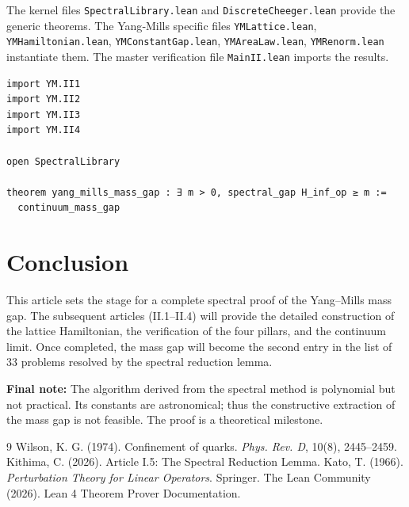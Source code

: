 \documentclass[11pt,a4paper]{article}
\begin{document}
The kernel files \texttt{SpectralLibrary.lean} and \texttt{DiscreteCheeger.lean} provide the generic theorems. The Yang‑Mills specific files \texttt{YMLattice.lean}, \texttt{YMHamiltonian.lean}, \texttt{YMConstantGap.lean}, \texttt{YMAreaLaw.lean}, \texttt{YMRenorm.lean} instantiate them. The master verification file \texttt{MainII.lean} imports the results.

\begin{lstlisting}[style=lean, caption={MainII.lean (sketch)}]
import YM.II1
import YM.II2
import YM.II3
import YM.II4

open SpectralLibrary

theorem yang_mills_mass_gap : ∃ m > 0, spectral_gap H_inf_op ≥ m :=
  continuum_mass_gap
\end{lstlisting}

\section{Conclusion}

This article sets the stage for a complete spectral proof of the Yang–Mills mass gap. The subsequent articles (II.1–II.4) will provide the detailed construction of the lattice Hamiltonian, the verification of the four pillars, and the continuum limit. Once completed, the mass gap will become the second entry in the list of 33 problems resolved by the spectral reduction lemma.

\vspace{0.5cm}
\noindent\textbf{Final note:} The algorithm derived from the spectral method is polynomial but not practical. Its constants are astronomical; thus the constructive extraction of the mass gap is not feasible. The proof is a theoretical milestone.


\begin{thebibliography}{9}
  Wilson, K. G. (1974). Confinement of quarks. \textit{Phys. Rev. D}, 10(8), 2445–2459.
  Kithima, C. (2026). Article I.5: The Spectral Reduction Lemma.
  Kato, T. (1966). \textit{Perturbation Theory for Linear Operators}. Springer.
  The Lean Community (2026). Lean 4 Theorem Prover Documentation.
\end{thebibliography}
\end{document}
